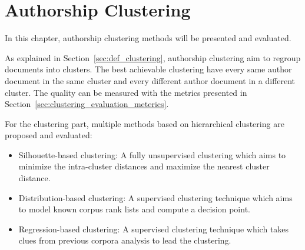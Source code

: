 \chapter{Authorship Clustering \label{sec:clustering}}

In this chapter, authorship clustering methods will be presented and evaluated.

As explained in Section~\ref{sec:def_clustering}, authorship clustering aim to regroup documents into clusters.
The best achievable clustering have every same author document in the same cluster and every different author document in a different cluster.
The quality can be measured with the metrics presented in Section~\ref{sec:clustering_evaluation_meterics}.

For the clustering part, multiple methods based on hierarchical clustering are proposed and evaluated:
\begin{itemize}
  \item
  Silhouette-based clustering: A fully unsupervised clustering which aims to minimize the intra-cluster distances and maximize the nearest cluster distance.
  \item
  Distribution-based clustering: A supervised clustering technique which aims to model known corpus rank lists and compute a decision point.
  \item
  Regression-based clustering: A supervised clustering technique which takes clues from previous corpora analysis to lead the clustering.
\end{itemize}






